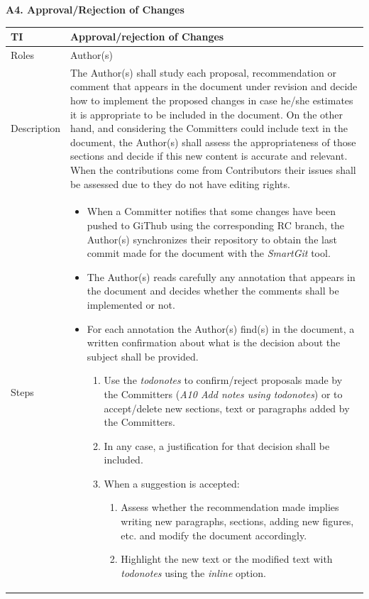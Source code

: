 \documentclass{template/openetcs_article}
\begin{document}
\textbf{A4. Approval/Rejection of Changes}
\begin{table}[H]
\begin{tabular}{|m{2cm}|m{12cm}|}
\hline
\rowcolor{myblue}
TI & 
Approval/rejection of Changes
\\\hline
Roles &
Author(s)
\\\hline
Description &
The Author(s) shall study each proposal, recommendation or comment that appears in the document under revision and decide how to implement the proposed changes in case he/she estimates it is appropriate to be included in the document. On the other hand, and considering the Committers could include text in the document, the Author(s) shall assess the appropriateness of those sections and decide if this new content is accurate and relevant. When the contributions come from Contributors their issues shall be assessed due to they do not have editing rights.
\\\hline
Steps &
\begin{itemize}
\item When a Committer notifies that some changes have been pushed to GiThub using the corresponding RC branch, the Author(s) synchronizes their repository to obtain the last commit made for the document with the {\it SmartGit} tool.
\item The Author(s) reads carefully any annotation that appears in the document and decides whether the comments shall be implemented or not.
\item For each annotation the Author(s) find(s) in the document, a written confirmation about what is the decision about the subject shall be provided. 
\begin{enumerate}
\item Use the {\it todonotes} to confirm/reject proposals made by the Committers ({\it A10 Add notes using todonotes}) or to accept/delete new sections, text or paragraphs added by the Committers.
\item In any case, a justification for that decision shall be included.
\item When a suggestion is accepted:
\begin{enumerate}
\item Assess whether the recommendation made implies writing new paragraphs, sections, adding new figures, etc. and modify the document accordingly. 
\item Highlight the new text or the modified text with {\it todonotes} using the {\it inline} option.
\end{enumerate}

\end{enumerate}
\end{itemize}
\end{tabular}
\end{table}
\end{document}
